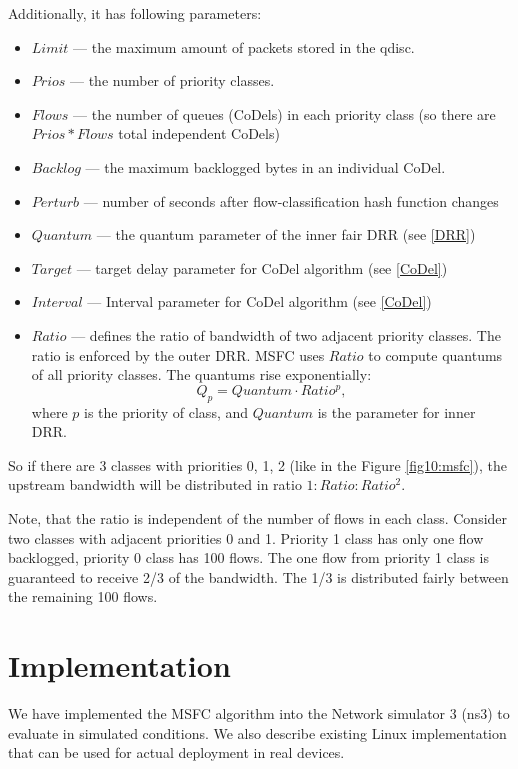 Additionally, it has following parameters:
\begin{itemize}
	\item $Limit$ --- the maximum amount of packets stored in the qdisc.
	\item $Prios$ --- the number of priority classes.
	\item $Flows$ --- the number of queues (CoDels) in each priority class (so there are $Prios*Flows$ total independent CoDels)
	\item $Backlog$ --- the maximum backlogged bytes in an individual CoDel.
	\item $Perturb$ --- number of seconds after flow-classification hash function changes
	\item $Quantum$ --- the quantum parameter of the inner fair DRR (see \ref{DRR})
	\item $Target$ --- target delay parameter for CoDel algorithm (see \ref{CoDel})
	\item $Interval$ --- Interval parameter for CoDel algorithm (see \ref{CoDel})
	\item $Ratio$ --- defines the ratio of bandwidth of two adjacent priority classes. The ratio is enforced by the outer DRR. MSFC uses $Ratio$ to compute quantums of all priority classes. The quantums rise exponentially:
	\[
	Q_p = Quantum \cdot Ratio^p,
	\]
	where $p$ is the priority of class, and $Quantum$ is the parameter for inner DRR.
\end{itemize}
So if there are 3 classes with priorities 0, 1, 2 (like in the Figure \ref{fig10:msfc}), the upstream bandwidth will be distributed in ratio $1:Ratio:Ratio^2$.

Note, that the ratio is independent of the number of flows in each class. Consider two classes with adjacent priorities 0 and 1. Priority 1 class has only one flow backlogged, priority 0 class has 100 flows. The one flow from priority 1 class is guaranteed to receive 2/3 of the bandwidth. The 1/3 is distributed fairly between the remaining 100 flows.


\section {Implementation}

We have implemented the MSFC algorithm into the Network simulator 3 (ns3) to evaluate in simulated conditions. We also describe existing Linux implementation that can be used for actual deployment in real devices.

